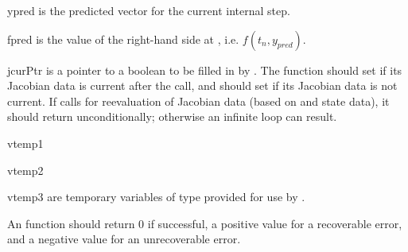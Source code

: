 {\begin{args}[convfail]
   \item[ypred]
     is the predicted  vector for the current {\cvodes} internal step.
  
   \item[fpred]
     is the value of the right-hand side at , i.e. $f(t_n, y_{pred})$.
  
   \item[jcurPtr]
     is a pointer to a boolean to be filled in by .  
     The function should set  if its Jacobian 
     data is current after the call, and should set         
      if its Jacobian data is not current.   
     If  calls for reevaluation of         
     Jacobian data (based on  and {\cvodes} state      
     data), it should return  unconditionally;
     otherwise an infinite loop can result.                
    
   \item[vtemp1] 
   \item[vtemp2]
   \item[vtemp3] 
     are temporary variables of type  provided for use by .      
  
   \end{args}
}
{
  An  function should return $0$ if successful,            
  a positive value for a recoverable error, and a negative value  
  for an unrecoverable error.  
}
{}


